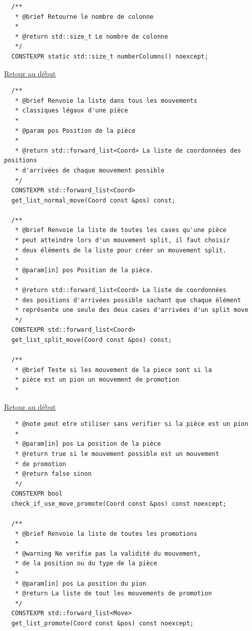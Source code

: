 {\begin{frame}[fragile]
\begin{verbatim}
  /**
   * @brief Retourne le nombre de colonne
   *
   * @return std::size_t Le nombre de colonne
   */
  CONSTEXPR static std::size_t numberColumns() noexcept;

\end{verbatim}
\end{frame}

\begin{frame}[fragile]
\hyperlink{conclusion}{Retour au début}\newline
\begin{verbatim}
  /**
   * @brief Renvoie la liste dans tous les mouvements
   * classiques légaux d'une pièce
   *
   * @param pos Position de la pièce
   *
   * @return std::forward_list<Coord> La liste de coordonnées des positions
   * d'arrivées de chaque mouvement possible
   */
  CONSTEXPR std::forward_list<Coord>
  get_list_normal_move(Coord const &pos) const;

  /**
   * @brief Renvoie la liste de toutes les cases qu'une pièce
   * peut atteindre lors d'un mouvement split, il faut choisir
   * deux éléments de la liste pour créer un mouvement split.
   *
   * @param[in] pos Position de la pièce.
   *
   * @return std::forward_list<Coord> La liste de coordonnées
   * des positions d'arrivées possible sachant que chaque élément
   * représente une seule des deux cases d'arrivées d'un split move
   */
  CONSTEXPR std::forward_list<Coord>
  get_list_split_move(Coord const &pos) const;

  /**
   * @brief Teste si les mouvement de la piece sont si la
   * pièce est un pion un mouvement de promotion
   *
\end{verbatim}
\end{frame}

\begin{frame}[fragile]
\hyperlink{conclusion}{Retour au début}\newline
\begin{verbatim}
   * @note peut etre utiliser sans verifier si la pièce est un pion
   *
   * @param[in] pos La position de la pièce
   * @return true si le mouvement possible est un mouvement
   * de promotion
   * @return false sinon
   */
  CONSTEXPR bool
  check_if_use_move_promote(Coord const &pos) const noexcept;

  /**
   * @brief Renvoie la liste de toutes les promotions
   *
   * @warning Ne verifie pas la validité du mouvement,
   * de la position ou du type de la pièce
   *
   * @param[in] pos La position du pion
   * @return La liste de tout les mouvements de promotion
   */
  CONSTEXPR std::forward_list<Move>
  get_list_promote(Coord const &pos) const noexcept;


\end{verbatim}
\end{frame}}
